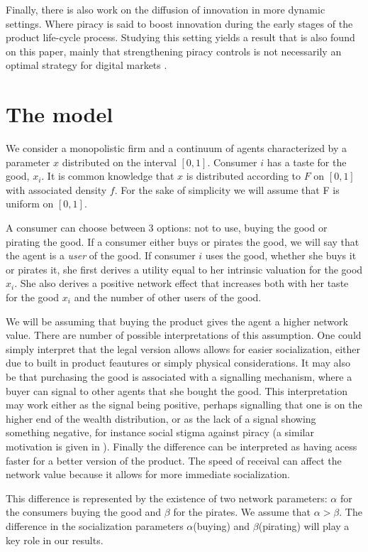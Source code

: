 Finally, there is also work on the diffusion of innovation in more dynamic settings. Where piracy is said to boost innovation during the early stages of the product life-cycle process. Studying this setting yields a result that is also found on this paper, mainly that strengthening piracy controls is not necessarily an optimal strategy for digital markets\citep{G03}  \citep{GMM95}.


\section{The model}

We consider a monopolistic firm and a continuum of agents characterized by a parameter $x$ distributed on the interval $[0,1]$. Consumer $i$ has a taste for the good, $x_i$. It is common knowledge that $x$ is distributed according to $F$ on $[0,1]$ with associated density $f$. For the sake of simplicity we will assume that F is uniform on $[0,1]$. 

A consumer can choose between 3 options: not to use, buying the good or pirating the good. If a consumer either buys or pirates the good, we will say that the agent is a \textit{user} of the good. If consumer $i$ uses the good, whether she buys it or pirates it, she first derives a utility equal to her intrinsic valuation for the good $x_i$. She also derives a positive network effect that increases both with her taste for the good $x_i$ and the number of other users of the good. 

We will be assuming that buying the product gives the agent a higher network value. There are number of possible interpretations of this assumption. One could simply interpret that the legal version allows allows for easier socialization, either due to built in product feautures or simply physical considerations. It may also be that purchasing the good is associated with a signalling mechanism, where a buyer can signal to other agents that she bought the good. This interpretation may work either as the signal being positive, perhaps signalling that one is on the higher end of the wealth distribution, or as the lack of a signal showing something negative, for instance social stigma against piracy (a similar motivation is given in \cite{CRP91}). Finally the difference can be interpreted as having acess faster for a better version of the product. The speed of receival can affect the network value because it allows for more immediate socialization. 

This difference is represented by the existence of two network parameters: $\alpha$ for the consumers buying the good and $\beta$ for the pirates. We assume that $\alpha > \beta$. The difference in the socialization parameters $\alpha$(buying) and $\beta$(pirating) will play a key role in our results. 


